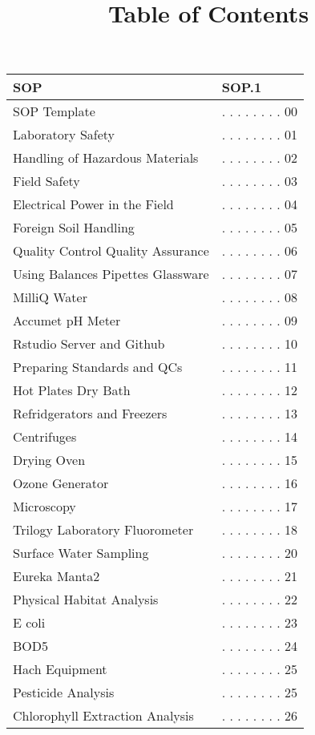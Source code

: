 \documentclass[18pt]{memoir}\usepackage[]{graphicx}\usepackage[]{color}
\title{Table of Contents}
\begin{document}
\begin{table}[ht]
\centering
\begin{tabular}{ll}
  \toprule
SOP & SOP.1 \\ 
  \midrule
SOP Template & . . . . . . . .  00 \\ 
  Laboratory Safety & . . . . . . . .  01 \\ 
  Handling of Hazardous Materials & . . . . . . . .  02 \\ 
  Field Safety & . . . . . . . .  03 \\ 
  Electrical Power in the Field & . . . . . . . .  04 \\ 
  Foreign Soil Handling & . . . . . . . .  05 \\ 
  Quality Control Quality Assurance & . . . . . . . .  06 \\ 
  Using Balances Pipettes Glassware & . . . . . . . .  07 \\ 
  MilliQ Water & . . . . . . . .  08 \\ 
  Accumet pH Meter & . . . . . . . .  09 \\ 
  Rstudio Server and Github & . . . . . . . .  10 \\ 
  Preparing Standards and QCs & . . . . . . . .  11 \\ 
  Hot Plates Dry Bath & . . . . . . . .  12 \\ 
  Refridgerators and Freezers & . . . . . . . .  13 \\ 
  Centrifuges & . . . . . . . .  14 \\ 
  Drying Oven & . . . . . . . .  15 \\ 
  Ozone Generator & . . . . . . . .  16 \\ 
  Microscopy & . . . . . . . .  17 \\ 
  Trilogy Laboratory Fluorometer & . . . . . . . .  18 \\ 
  Surface Water Sampling & . . . . . . . .  20 \\ 
  Eureka Manta2 & . . . . . . . .  21 \\ 
  Physical Habitat Analysis & . . . . . . . .  22 \\ 
  E coli & . . . . . . . .  23 \\ 
  BOD5 & . . . . . . . .  24 \\ 
  Hach Equipment & . . . . . . . .  25 \\ 
   Pesticide Analysis & . . . . . . . .  25 \\ 
  Chlorophyll Extraction Analysis & . . . . . . . .  26 \\ 

\end{tabular}
\end{table}
\end{document}
